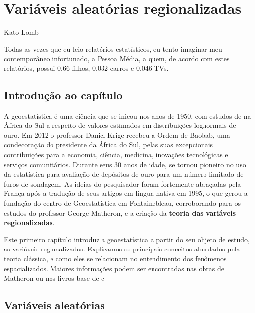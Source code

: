 


\chapter{Variáveis aleatórias regionalizadas} \label{cap_var_reg}

\begin{myquoting}{Kato Lomb}
	
	Todas as vezes que eu leio relatórios estatísticos, eu tento imaginar meu contemporâneo infortunado, a Pessoa Média, a quem, de acordo com estes relatórios, possui 0.66 filhos, 0.032 carros e 0.046 TVs. 
	
\end{myquoting}

\section{Introdução ao capítulo}

A geoestatística é uma ciência que se inicou nos anos de 1950, com estudos de \citet{krige1960departure}  na África do Sul a respeito de valores estimados em distribuições lognormais de ouro. Em 2012 o professor Daniel Krige recebeu a Ordem de Baobab, uma condecoração do presidente da África do Sul, pelas suas excepcionais contribuições para a economia, ciência, medicina, inovações tecnológicas e serviços comunitários. Durante seus 30 anos de idade,  se tornou pioneiro no uso da estatística para avaliação de depósitos de ouro para um número limitado de furos de sondagem. As ideias do pesquisador foram fortemente abraçadas pela França após a tradução de seus artigos em língua nativa em 1995, o que gerou a fundação do centro de Geoestatística em Fontainebleau, corroborando para os estudos do professor George Matheron, e a criação da \textbf{teoria das variáveis regionalizadas}.


 Este primeiro capítulo introduz a geoestatística a partir do seu objeto de estudo, as variáveis regionalizadas. Explicamos os principais conceitos abordados pela teoria clássica, e como eles se relacionam no entendimento dos fenômenos espacializados. Maiores informações podem ser encontradas nas obras de Matheron \cite{matheron1963principles} ou nos livros base de \cite{isaaks1989applied} e \cite{goovaerts1997geostatistics}


\section{Variáveis aleatórias} 

